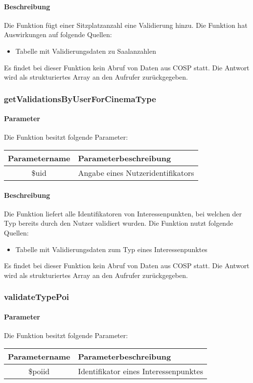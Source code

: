 \paragraph{Beschreibung} Die Funktion fügt einer Sitzplatzanzahl eine Validierung hinzu. Die Funktion hat Auswirkungen auf folgende Quellen:
\begin{itemize}
	\item Tabelle mit Validierungsdaten zu Saalanzahlen
\end{itemize}
Es findet bei dieser Funktion kein Abruf von Daten aus {\glqq COSP\grqq} statt. Die Antwort wird als strukturiertes Array an den Aufrufer zurückgegeben.
\subsubsection{getValidationsByUserForCinemaType}
\paragraph{Parameter} Die Funktion besitzt folgende Parameter:
\begin{table}[H]
	\begin{tabular}{|c|p{11cm}|}
		\hline
		\textbf{Parametername} & \textbf{Parameterbeschreibung} \\ \hline
		\$uid & Angabe eines Nutzeridentifikators \\ \hline
	\end{tabular}
\end{table}
\paragraph{Beschreibung} Die Funktion liefert alle Identifikatoren von Interessenpunkten, bei welchen der Typ bereits durch den Nutzer validiert wurden. Die Funktion nutzt folgende Quellen:
\begin{itemize}
	\item Tabelle mit Validierungsdaten zum Typ eines Interessenpunktes
\end{itemize}
Es findet bei dieser Funktion kein Abruf von Daten aus {\glqq COSP\grqq} statt. Die Antwort wird als strukturiertes Array an den Aufrufer zurückgegeben.
\subsubsection{validateTypePoi}
\paragraph{Parameter} Die Funktion besitzt folgende Parameter:
\begin{table}[H]
	\begin{tabular}{|c|p{11cm}|}
		\hline
		\textbf{Parametername} & \textbf{Parameterbeschreibung} \\ \hline
		\$poiid & Identifikator eines Interessenpunktes \\ \hline
	\end{tabular}
\end{table}

